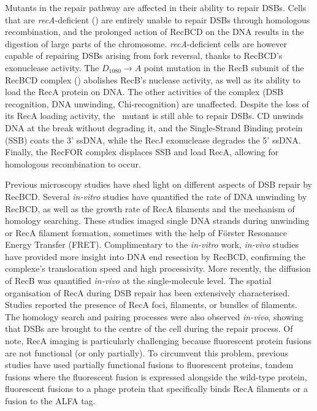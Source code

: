 Mutants in the repair pathway are affected in their ability to repair DSBs. Cells that are \emph{recA}-deficient (\dreca) are entirely unable to repair DSBs through homologous recombination, and the prolonged action of RecBCD on the DNA results in the digestion of large parts of the chromosome\cite{Horii1968, Chow2007}. \emph{recA}-deficient cells are however capable of repairing DSBs arising from fork reversal, thanks to RecBCD's exonuclease activity\cite{Seigneur1998, Michel2001}. The $D_{1080} \rightarrow A$ point mutation in the RecB subunit of the RecBCD complex (\teneighty) abolishes RecB's nuclease activity, as well as its ability to load the RecA protein on DNA\cite{Yu1998, Wang2000}. The other activities of the complex (DSB recognition, DNA unwinding, Chi-recognition) are unaffected\cite{Anderson1999}. Despite the loss of its RecA loading activity, the \teneighty\ mutant is still able to repair DSBs. \teneighty CD unwinds DNA at the break without degrading it, and the Single-Strand Binding protein (SSB) coats the 3' ssDNA, while the RecJ exonuclease degrades the 5' ssDNA. Finally, the RecFOR complex displaces SSB and load RecA, allowing for homologous recombination to occur\cite{Ivancic-Bace_2003}.

Previous microscopy studies have shed light on different aspects of DSB repair by RecBCD. Several \emph{in-vitro} studies have quantified the rate of DNA unwinding by RecBCD\cite{Spies2003,Liu2013}, as well as the growth rate of RecA filaments\cite{Joo2006,Galletto2006,Handa2009} and the mechanism of homology searching\cite{Forget2012,Ragunathan2012}. These studies imaged single DNA strands during unwinding or RecA filament formation, sometimes with the help of Förster Resonance Energy Transfer (FRET)\cite{Joo2006,Ragunathan2012}. Complimentary to the \emph{in-vitro} work, \emph{in-vivo} studies have provided more insight into DNA end resection by RecBCD\cite{Wiktor2018}, confirming the complexe's translocation speed and high processivity. More recently, the diffusion of RecB was quantified \emph{in-vivo} at the single-molecule level\cite{Lepore2023}. The spatial organisation of RecA during DSB repair has been extensively characterised. Studies reported the presence of RecA foci\cite{Renzette2005,Renzette2007,Centore2007,Amarh2018}, filaments\cite{Kidane2005}, or bundles of filaments\cite{Lesterlin2013,Ghodke2019}. The homology search and pairing processes were also observed \emph{in-vivo}, showing that DSBs are brought to the centre of the cell during the repair process\cite{Badrinarayanan2015,Wiktor2021}. Of note, RecA imaging is particularly challenging because fluorescent protein fusions are not functional (or only partially). To circumvent this problem, previous studies have used partially functional fusions to fluorescent proteins\cite{Kidane2005,Renzette2005,Renzette2007,Centore2007,Lesterlin2013,Klimova2020}, tandem fusions where the fluorescent fusion is expressed alongside the wild-type protein\cite{Amarh2018,Wiktor2021}, fluorescent fusions to a phage protein that specifically binds RecA filaments\cite{Ghodke2019} or a fusion to the ALFA tag\cite{Wiktor2021}.

